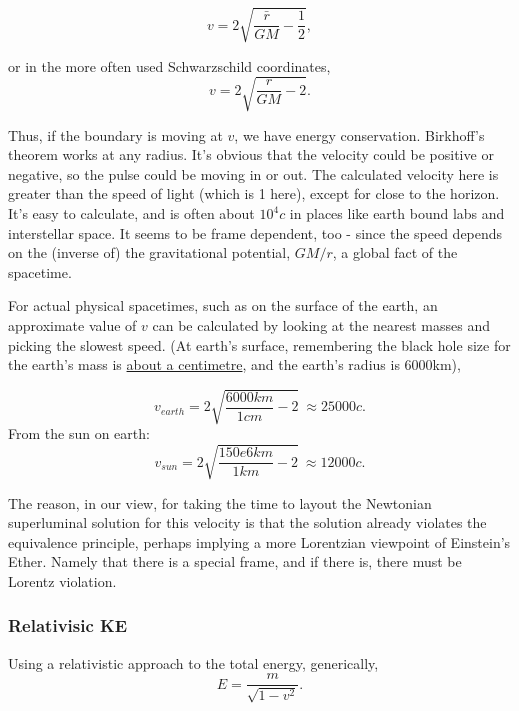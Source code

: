 \documentclass[../rzero]{subfiles}
\begin{document}
\begin{equation}
 v = 2 \sqrt{\frac{\bar r}{G M} - \frac{1}{2}},
\end{equation}

or in the more often used Schwarzschild coordinates,
\begin{equation}
 v = 2 \sqrt{\frac{r}{G M} - 2}.
\end{equation}

Thus, if the boundary is moving at $v$, we have energy conservation. Birkhoff's theorem works at any radius. It's obvious that the velocity could be positive or negative, so the pulse could be moving in or out. The calculated velocity here is greater than the speed of light (which is 1 here), except for close to the horizon. It's easy to calculate, and is often about $10^4c$ in places like earth bound labs and interstellar space. It seems to be frame dependent, too - since the speed depends on the (inverse of) the gravitational potential, $GM/r$, a global fact of the spacetime. 

For actual physical spacetimes, such as on the surface of the earth, an approximate value of $v$ can be calculated by looking at the nearest masses and picking the slowest speed. (At earth's surface, remembering the black hole size for the earth's mass is \href{https://www.wolframalpha.com/input?i=G*%28mass+of+earth%29%2Fc%5E2}{about a centimetre}, and the earth's radius is 6000km), 

\begin{equation}
 v_{earth} = 2 \sqrt{\frac{6000km}{1 cm} - 2} \ \approx 25000c .
\end{equation}
From the sun on earth:
\begin{equation}
 v_{sun} = 2 \sqrt{\frac{150e6km}{1 km} - 2} \ \approx 12000c .
\end{equation}

The reason, in our view, for taking the time to layout the Newtonian superluminal solution for this velocity is that the solution already violates the equivalence principle, perhaps implying a more Lorentzian viewpoint  of Einstein's Ether\cite{Einstein1920}. Namely that there is a special frame, and if there is, there must be Lorentz violation.  



\subsubsection{Relativisic KE}
Using a relativistic approach to the total energy, generically, 
\begin{equation}
 E = \frac{m}{\sqrt{1 - v^2}}.
\end{equation}
\end{document}
